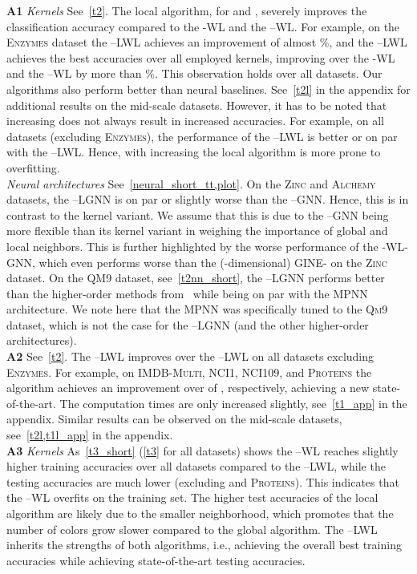 \documentclass{article}
\newcommand{\xhdr}[1]{{\noindent\bfseries #1}}
\theoremstyle{definition}
\newcommand{\kwl}{-\textsf{WL}\xspace}
\newcommand{\deltakwl}{--\textsf{WL}\xspace}
\newcommand{\pluskwl}{--\textsf{LWL}\xspace}
\newcommand{\mpnn}{\textsf{MPNN}\xspace}
\newcommand{\gineeps}{\textsf{GINE-}\xspace}
\begin{document}
\xhdr{A1} \textit{Kernels} See~\cref{t2}. The local algorithm, for   and , severely improves the classification accuracy compared to the \kwl and the \deltakwl. For example, on the \textsc{Enzymes} dataset the --\textsf{LWL} achieves an improvement of almost \%, and the --\textsf{LWL} achieves the best accuracies over all employed kernels, improving over the -\textsf{WL} and the --\textsf{WL} by more than \%. This observation holds over all datasets. Our algorithms also perform better than neural baselines. See~\cref{t2l} in the appendix for additional results on the mid-scale datasets. However, it has to be noted that increasing  does not always result in increased accuracies. For example, on all datasets (excluding \textsc{Enzymes}), the performance of the --\textsf{LWL} is better or on par with the --\textsf{LWL}. Hence, with increasing  the local algorithm is more prone to overfitting.\\
\textit{Neural architectures} See~\cref{neural_short_tt,plot}. On the \textsc{Zinc} and \textsc{Alchemy} datasets, the --\textsf{LGNN} is on par or slightly worse than the --\textsf{GNN}. Hence, this is in contrast to the kernel variant. We assume that this is due to the  --\textsf{GNN} being more flexible than its kernel variant in weighing the importance of global and local neighbors. This is further highlighted by the worse performance of the -\textsf{WL-GNN}, which even performs worse than the (-dimensional) \gineeps on the \textsc{Zinc} dataset. On the \textsc{QM9} dataset, see~\cref{t2nn_short}, the --\textsf{LGNN} performs better than the higher-order methods from~\cite{Mar+2019,Mor+2019} while being on par with the \mpnn architecture. We note here that the \mpnn was specifically tuned to the \textsc{Qm9} dataset, which is not the case for the --\textsf{LGNN} (and the other higher-order architectures).\\
\xhdr{A2} See~\cref{t2}. The --\textsf{LWL} improves over the --\textsf{LWL} on all datasets excluding \textsc{Enzymes}. For example, on \textsc{IMDB-Multi}, \textsc{NCI1}, \textsc{NCI109}, and \textsc{Proteins} the algorithm achieves an improvement over of , respectively, achieving a new state-of-the-art. The computation times are only increased slightly, see~\cref{t1_app} in the appendix. Similar results can be observed on the mid-scale datasets, see~\cref{t2l,t1l_app} in the appendix.\\
\xhdr{A3} \textit{Kernels} As~\cref{t3_short} (\cref{t3} for all datasets) shows the --\textsf{WL} reaches slightly higher training accuracies over all datasets compared to the --\textsf{LWL}, while the testing accuracies are much lower (excluding  and \textsc{Proteins}). This indicates that the  --\textsf{WL} overfits on the training set. The higher test accuracies of the local algorithm are likely due to the smaller neighborhood, which promotes that the number of colors grow slower compared to the global algorithm. The \pluskwl inherits the strengths of both algorithms, i.e., achieving the overall best training accuracies while achieving state-of-the-art testing accuracies.\\
\end{document}
